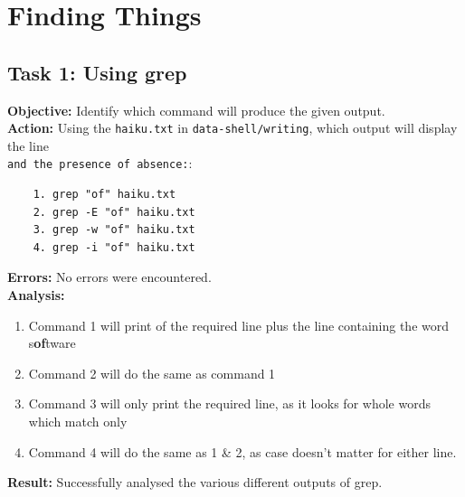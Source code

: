 \documentclass{article}
\begin{document}
\newpage
\section{Finding Things}
%
\subsection{Task 1: Using grep}
%
\textbf{Objective:} Identify which command will produce the given output.\\
\textbf{Action:} Using the \texttt{haiku.txt} in \verb|data-shell/writing|, which output will display the line\\ \texttt{and the presence of absence:}:
\begin{verbatim}
    1. grep "of" haiku.txt
    2. grep -E "of" haiku.txt
    3. grep -w "of" haiku.txt
    4. grep -i "of" haiku.txt
\end{verbatim}
\textbf{Errors:} No errors were encountered.\\
\textbf{Analysis:}
\begin{enumerate}
    \item Command 1 will print of the required line plus the line containing the word s\textbf{of}tware
    \item Command 2 will do the same as command 1
    \item Command 3 will only print the required line, as it looks for whole words which match only
    \item Command 4 will do the same as 1 \& 2, as case doesn't matter for either line.
\end{enumerate}
\textbf{Result:} Successfully analysed the various different outputs of grep.
%
\end{document}
